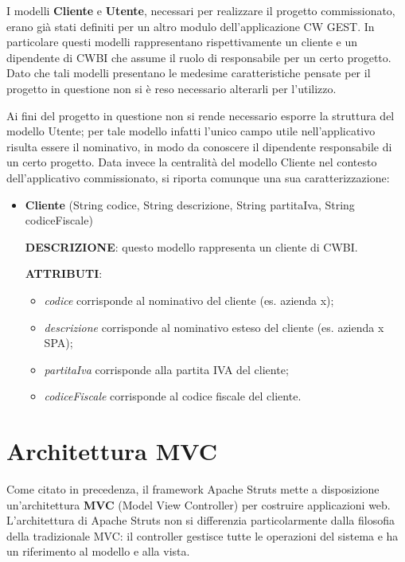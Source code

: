 \setlength{\parskip}{6ex}

\noindent I modelli \textbf{Cliente} e \textbf{Utente}, necessari per realizzare il progetto commissionato, erano già stati definiti per un altro modulo dell'applicazione CW GEST. In particolare questi modelli rappresentano rispettivamente un cliente e un dipendente di CWBI che assume il ruolo di responsabile per un certo progetto. Dato che tali modelli presentano le medesime caratteristiche pensate per il progetto in questione non si è reso necessario alterarli per l'utilizzo.

\setlength{\parskip}{3ex}

\noindent Ai fini del progetto in questione non si rende necessario esporre la struttura del modello Utente; per tale modello infatti l'unico campo utile nell'applicativo risulta essere il nominativo, in modo da conoscere il dipendente responsabile di un certo progetto. Data invece la centralità del modello Cliente nel contesto dell'applicativo commissionato, si riporta comunque una sua caratterizzazione:
\begin{itemize}
\item \textbf{Cliente} (String codice, String descrizione, String partitaIva, String codiceFiscale)

\setlength{\parskip}{3ex}

\textbf{DESCRIZIONE}: questo modello rappresenta un cliente di CWBI.

\setlength{\parskip}{3ex}

\textbf{ATTRIBUTI}:
\begin{itemize}
\item \textit{codice} corrisponde al nominativo del cliente (es. azienda x);
\item \textit{descrizione} corrisponde al nominativo esteso del cliente (es. azienda x SPA);
\item \textit{partitaIva} corrisponde alla partita IVA del cliente;
\item \textit{codiceFiscale} corrisponde al codice fiscale del cliente.
\end{itemize}
\end{itemize} 

\pagebreak

\section{Architettura MVC}
Come citato in precedenza, il framework Apache Struts mette a disposizione un'architettura \textbf{MVC} (Model View Controller) per costruire applicazioni web. \\
L'architettura di Apache Struts non si differenzia particolarmente dalla filosofia della tradizionale MVC: il controller gestisce tutte le operazioni del sistema e ha un riferimento al modello e alla vista. 

